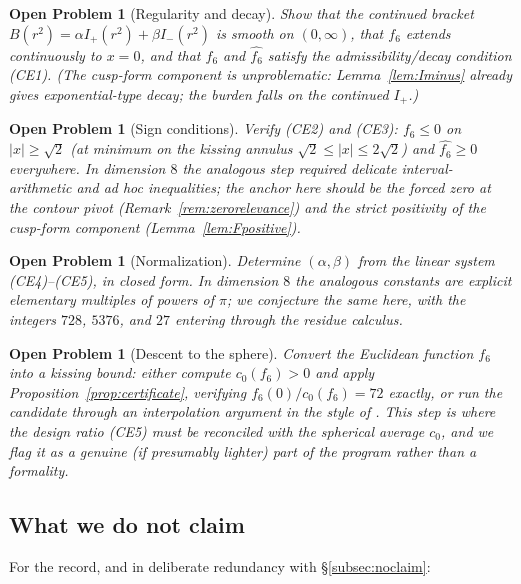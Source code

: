 \documentclass[11pt,reqno]{amsart}
\theoremstyle{plain}
\newtheorem{openproblem}[theorem]{Open Problem}
\theoremstyle{definition}
\theoremstyle{remark}
\newcommand{\Ip}{I_{+}}
\newcommand{\Imm}{I_{-}}
\newcommand{\fhat}[1]{\widehat{#1}}
\begin{document}
\begin{openproblem}[Regularity and decay]\label{op:schwartz}
Show that the continued bracket
$B(r^2)=\alpha\Ip(r^2)+\beta\Imm(r^2)$ is smooth on $(0,\infty)$,
that $f_6$ extends continuously to $x=0$, and that $f_6$ and
$\fhat{f_6}$ satisfy the admissibility/decay condition (CE1).  (The
cusp-form component is unproblematic: Lemma~\ref{lem:Iminus} already
gives exponential-type decay; the burden falls on the continued
$\Ip$.)
\end{openproblem}

\begin{openproblem}[Sign conditions]\label{op:signs}
Verify (CE2) and (CE3): $f_6\le0$ on $|x|\ge\sqrt2$ (at minimum on
the kissing annulus $\sqrt2\le|x|\le2\sqrt2$) and
$\fhat{f_6}\ge0$ everywhere.  In dimension $8$ the analogous step
required delicate interval-arithmetic and ad hoc inequalities; the
anchor here should be the forced zero at the contour pivot
(Remark~\ref{rem:zerorelevance}) and the strict positivity of the
cusp-form component (Lemma~\ref{lem:Fpositive}).
\end{openproblem}

\begin{openproblem}[Normalization]\label{op:alphabeta}
Determine $(\alpha,\beta)$ from the linear system (CE4)--(CE5), in
closed form.  In dimension $8$ the analogous constants are explicit
elementary multiples of powers of $\pi$; we conjecture the same here,
with the integers $728$, $5376$, and $27$ entering through the residue
calculus.
\end{openproblem}

\begin{openproblem}[Descent to the sphere]\label{op:descent}
Convert the Euclidean function $f_6$ into a kissing bound: either
compute $c_0(f_6)>0$ and apply Proposition~\ref{prop:certificate},
verifying $f_6(0)/c_0(f_6)=72$ exactly, or run the candidate through
an interpolation argument in the style of \cite{CKMRV2022}.  This step
is where the design ratio (CE5) must be reconciled with the spherical
average $c_0$, and we flag it as a genuine (if presumably lighter)
part of the program rather than a formality.
\end{openproblem}

\subsection*{What we do not claim}

For the record, and in deliberate redundancy with
\S\ref{subsec:noclaim}:
\end{document}
